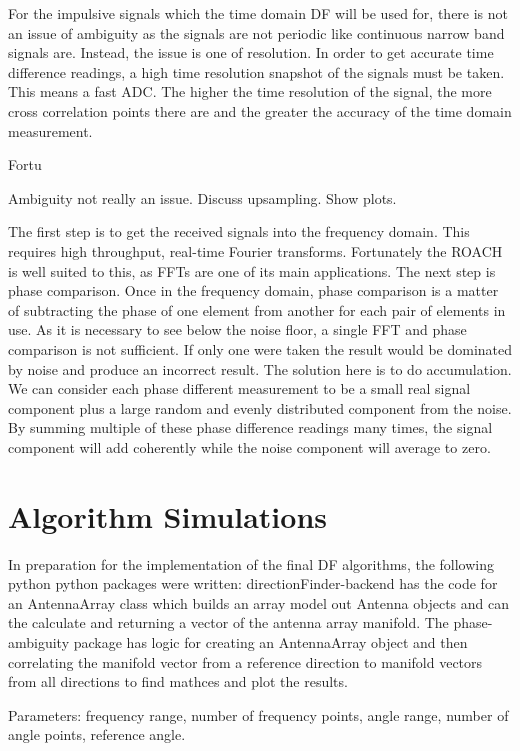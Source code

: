 For the impulsive signals which the time domain DF will be used for, there is not an issue of ambiguity as the signals are not periodic like continuous narrow band signals are. Instead, the issue is one of resolution. In order to get accurate time difference readings, a high time resolution snapshot of the signals must be taken. This means a fast ADC. The higher the time resolution of the signal, the more cross correlation points there are and the greater the accuracy of the time domain measurement.

Fortu

Ambiguity not really an issue.
Discuss upsampling. Show plots.

The first step is to get the received signals into the frequency domain. This requires high throughput, real-time Fourier transforms. Fortunately the ROACH is well suited to this, as FFTs are one of its main applications. The next step is phase comparison. Once in the frequency domain, phase comparison is a matter of subtracting the phase of one element from another for each pair of elements in use. As it is necessary to see below the noise floor, a single FFT and phase comparison is not sufficient. If only one were taken the result would be dominated by noise and produce an incorrect result. The solution here is to do accumulation. We can consider each phase different measurement to be a small real signal component plus a large random and evenly distributed component from the noise. By summing multiple of these phase difference readings many times, the signal component will add coherently while the noise component will average to zero. 

\section{Algorithm Simulations}
In preparation for the implementation of the final DF algorithms, the following python python packages were written: 
directionFinder-backend has the code for an AntennaArray class which builds an array model out Antenna objects and can the calculate and returning a vector of the antenna array manifold. The phase-ambiguity package has logic for creating an AntennaArray object and then correlating the manifold vector from a reference direction to manifold vectors from all directions to find mathces and plot the results.

Parameters:
frequency range, number of frequency points, angle range, number of angle points, reference angle.

